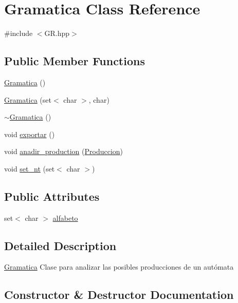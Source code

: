 \hypertarget{class_gramatica}{}\section{Gramatica Class Reference}
\label{class_gramatica}


{\ttfamily \#include $<$G\+R.\+hpp$>$}

\subsection*{Public Member Functions}
\begin{DoxyCompactItemize}
\item 
\hyperlink{class_gramatica_a22ad135e5e5fc60820c26b0c4085cef7}{Gramatica} ()
\item 
\hyperlink{class_gramatica_ae9176ae1de55840b18642b1428bea25a}{Gramatica} (set$<$ char $>$, char)
\item 
\hyperlink{class_gramatica_a25b75ecf041599ef652ff37156db1e17}{$\sim$\+Gramatica} ()
\item 
void \hyperlink{class_gramatica_ae18ba291a24ebcb6faff237c4eb33c29}{exportar} ()
\item 
void \hyperlink{class_gramatica_ada4af4c0eba8a829a98417168e93d2db}{anadir\+\_\+production} (\hyperlink{class_produccion}{Produccion})
\item 
void \hyperlink{class_gramatica_ae11df05a075362d577443b8f011aa24f}{set\+\_\+nt} (set$<$ char $>$)
\end{DoxyCompactItemize}
\subsection*{Public Attributes}
\begin{DoxyCompactItemize}
\item 
set$<$ char $>$ \hyperlink{class_gramatica_a538ac9ed9a10b67ab206402b326e787e}{alfabeto}
\end{DoxyCompactItemize}


\subsection{Detailed Description}
\hyperlink{class_gramatica}{Gramatica}  Clase para analizar las posibles producciones de un autómata 

\subsection{Constructor \& Destructor Documentation}
\mbox{\label{class_gramatica_a22ad135e5e5fc60820c26b0c4085cef7}} 
